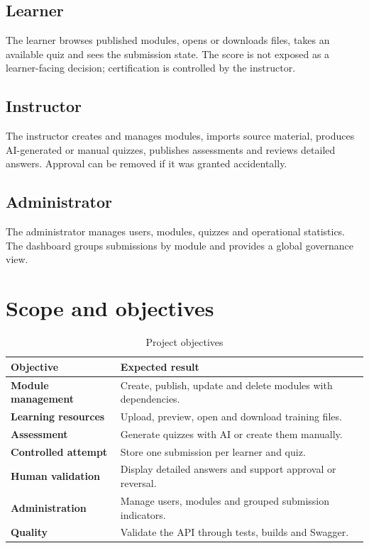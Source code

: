 \subsection{Learner}
The learner browses published modules, opens or downloads files, takes an
available quiz and sees the submission state. The score is not exposed as a
learner-facing decision; certification is controlled by the instructor.

\subsection{Instructor}
The instructor creates and manages modules, imports source material, produces
AI-generated or manual quizzes, publishes assessments and reviews detailed
answers. Approval can be removed if it was granted accidentally.

\subsection{Administrator}
The administrator manages users, modules, quizzes and operational statistics.
The dashboard groups submissions by module and provides a global governance
view.

\section{Scope and objectives}
\begin{table}[H]\centering
\caption{Project objectives}\label{tab:objectives}
\begin{tabularx}{\textwidth}{>{\bfseries}p{}X}
\toprule Objective & Expected result\\\midrule
Module management & Create, publish, update and delete modules with dependencies.\\
Learning resources & Upload, preview, open and download training files.\\
Assessment & Generate quizzes with AI or create them manually.\\
Controlled attempt & Store one submission per learner and quiz.\\
Human validation & Display detailed answers and support approval or reversal.\\
Administration & Manage users, modules and grouped submission indicators.\\
Quality & Validate the API through tests, builds and Swagger.\\
\bottomrule
\end{tabularx}
\end{table}

